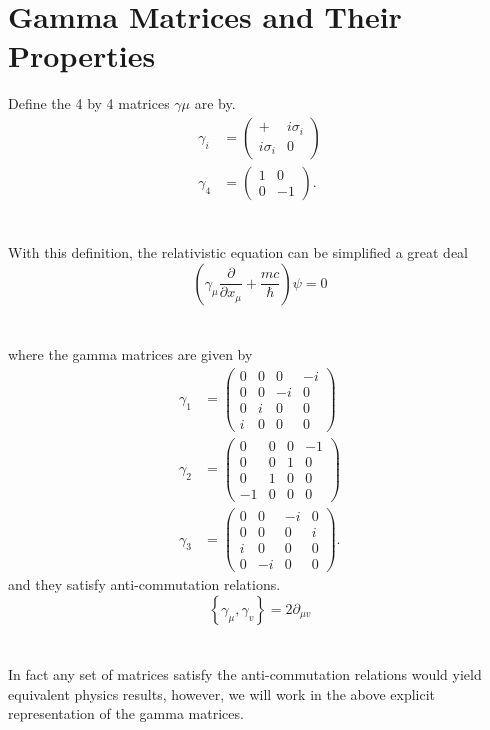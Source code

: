 \documentclass{report}
\begin{document}
\section{Gamma Matrices and Their Properties}
Define the 4 by 4 matrices $\displaystyle \gamma \mu$ are by.
\begin{align*}
	\gamma_{i} & = \begin{pmatrix} + & i \sigma_{i} \\ i \sigma_{i} & 0 \end{pmatrix} \\
	\gamma_4   & = \begin{pmatrix} 1 & 0 \\ 0 & -1 \end{pmatrix}
	.\end{align*} \\ \\
With this definition, the relativistic equation can be simplified a great deal
\begin{equation}
	\left( \gamma_{\mu} \frac{ \partial  }{ \partial x_{\mu} } + \frac{mc}{\hbar}  \right) \psi = 0
\end{equation}\\ \\
where the gamma matrices are given by
\begin{align*}
	\gamma_{1} & = \begin{pmatrix} 0 & 0 & 0 & -i \\ 0 & 0 & -i & 0 \\ 0 & i & 0 & 0 \\ i & 0 & 0 & 0 \end{pmatrix} \\
	\gamma_{2} & = \begin{pmatrix} 0 & 0 & 0 & -1 \\ 0 & 0 & 1 & 0 \\ 0 & 1 & 0 & 0 \\ -1 & 0 & 0 & 0 \end{pmatrix} \\
	\gamma_{3} & = \begin{pmatrix} 0 & 0 & -i & 0 \\ 0 & 0 & 0 & i \\ i & 0 & 0 & 0 \\ 0 & -i & 0 & 0 \end{pmatrix}
	.\end{align*}
and they satisfy anti-commutation relations.
\begin{equation}
	\left\{ \gamma_{\mu}, \gamma_{v} \right\}  = 2 \partial_{\mu v}
\end{equation}\\ \\
In fact any set of matrices satisfy the anti-commutation relations would yield equivalent physics results, however, we will work in the above explicit representation of the gamma matrices.\\ \\
\end{document}
